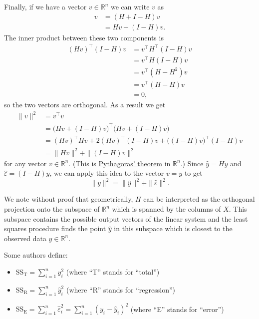 \documentclass[
  a4paper,
]{article}
\providecommand{\tightlist}{%
  \setlength{\itemsep}{0pt}\setlength{\parskip}{0pt}}
\theoremstyle{definition}
\theoremstyle{definition}
\theoremstyle{definition}
\theoremstyle{definition}
\theoremstyle{remark}
\begin{document}
Finally, if we have a vector \(v \in \mathbb{R}^n\) we can write \(v\) as
\begin{align*}
  v
  &= (H + I - H)v \\
  &= Hv + (I-H)v.
\end{align*}
The inner product between these two components is
\begin{align*}
  (Hv)^\top (I-H)v
  &= v^\top H^\top (I-H) v \\
  &= v^\top H (I-H) v \\
  &= v^\top (H-H^2) v \\
  &= v^\top (H-H) v \\
  &= 0,
\end{align*}
so the two vectors are orthogonal.
As a result we get
\begin{align*}
  \|v\|^2
  &= v^\top v \\
  &= \bigl( Hv + (I-H)v \bigr)^\top \bigl( Hv + (I-H)v \bigr) \\
  &= (Hv)^\top Hv + 2 (Hv)^\top (I-H)v + \bigl((I-H)v\bigr)^\top (I-H)v \\
  &= \| Hv \|^2 + \|(I-H)v \|^2
\end{align*}
for any vector \(v \in \mathbb{R}^n\).
(This is \href{https://en.wikipedia.org/wiki/Pythagorean_theorem}{Pythagoras' theorem} in \(\mathbb{R}^n\).)
Since \(\hat y = Hy\) and \(\hat\varepsilon= (I - H)y\), we can apply this idea to the
vector \(v = y\) to get
\begin{equation}
  \|y\|^2
  = \|\hat y\|^2 + \|\hat\varepsilon\|^2.  \label{eq:eps-y-orth}
\end{equation}

We note without proof that geometrically, \(H\) can be interpreted as the
orthogonal projection onto the subspace of \(\mathbb{R}^n\) which is spanned by
the columns of \(X\). This subspace contains the possible output vectors
of the linear system and the least squares procedure finds the point \(\hat y\)
in this subspace which is closest to the observed data \(y\in\mathbb{R}^n\).

Some authors define:

\begin{itemize}
\tightlist
\item
  \(\mathrm{SS}_\mathrm{T} = \sum_{i=1}^n y_i^2\) (where ``T'' stands for ``total'')
\item
  \(\mathrm{SS}_\mathrm{R} = \sum_{i=1}^n \hat y_i^2\) (where ``R'' stands for ``regression'')
\item
  \(\mathrm{SS}_\mathrm{E} = \sum_{i=1}^n \hat\varepsilon_i^2 = \sum_{i=1}^n (y_i-\hat y_i)^2\) (where ``E'' stands for ``error'')
\end{itemize}
\end{document}
